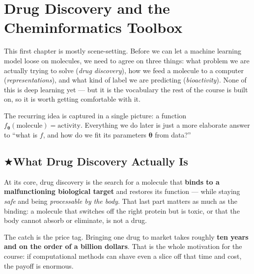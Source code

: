 \documentclass[11pt, oneside]{book}
\makeatletter
\newcommand{\starglyph}{\textcolor{stargold}{\ensuremath{\bigstar}}}
\newcommand{\starsec}[1]{%
  \texorpdfstring{\starglyph\hspace{0.4em}\textcolor{star@frame}{#1}}{#1}}
\newcommand{\params}{\boldsymbol{\theta}}   %
\makeatother
\begin{document}
\setcounter{tocdepth}{2}  %

\begingroup
  \let\cleardoublepage\relax
  \let\clearpage\relax
  \tableofcontents
\endgroup

\mainmatter  %


\chapter{Drug Discovery and the Cheminformatics Toolbox}
\label{chap:drugdiscovery}

This first chapter is mostly scene-setting. Before we can let a machine
learning model loose on molecules, we need to agree on three things: what
problem we are actually trying to solve (\emph{drug discovery}), how we feed a
molecule to a computer (\emph{representations}), and what kind of label we are
predicting (\emph{bioactivity}). None of this is deep learning yet --- but it is
the vocabulary the rest of the course is built on, so it is worth getting
comfortable with it.

The recurring idea is captured in a single picture: a function
$f_{\params}(\text{molecule}) = \text{activity}$. Everything we do later is just
a more elaborate answer to ``what is $f$, and how do we fit its parameters
$\params$ from data?''

\section{\starsec{What Drug Discovery Actually Is}}

At its core, drug discovery is the search for a molecule that \textbf{binds to a
malfunctioning biological target} and restores its function --- while staying
\emph{safe} and being \emph{processable by the body}. That last part matters as
much as the binding: a molecule that switches off the right protein but is toxic,
or that the body cannot absorb or eliminate, is not a drug.

The catch is the price tag. Bringing one drug to market takes roughly
\textbf{ten years and on the order of a billion dollars}. That is the whole
motivation for the course: if computational methods can shave even a slice off
that time and cost, the payoff is enormous.
\end{document}

